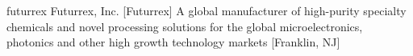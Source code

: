 \newglsXcompany%
{futurrex}%
{Futurrex, Inc.}%
[Futurrex]%
{A global manufacturer of high-purity specialty chemicals and novel processing solutions for the global microelectronics, photonics and other high growth technology markets \cite{website:Futurrex}}%
[Franklin, NJ]%